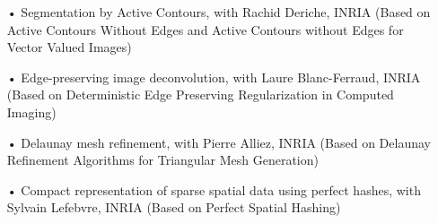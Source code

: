 \documentclass{cv}
\begin{document}
		\begin{position}[title={Other research projects with implementations},%
		                 institution={Université de Nice Sophia-Antipolis},%
		                 country=France,%
		                 from=2007,%
		                 to=2008]
			\vspace{-\baselineskip} %
			\begin{itemize}
				\item[•] Segmentation by Active Contours, with Rachid Deriche, INRIA (Based on Active Contours Without Edges and Active Contours without Edges for Vector Valued Images)
				\item[•] Edge-preserving image deconvolution, with Laure Blanc-Ferraud, INRIA (Based on Deterministic Edge Preserving Regularization in Computed Imaging)
				\item[•] Delaunay mesh refinement, with Pierre Alliez, INRIA (Based on Delaunay Refinement Algorithms for Triangular Mesh Generation)
				\item[•] Compact representation of sparse spatial data using perfect hashes, with Sylvain Lefebvre, INRIA (Based on Perfect Spatial Hashing)
			\end{itemize}
		\end{position}

	\vspace{-0.5\baselineskip} %
\end{document}
